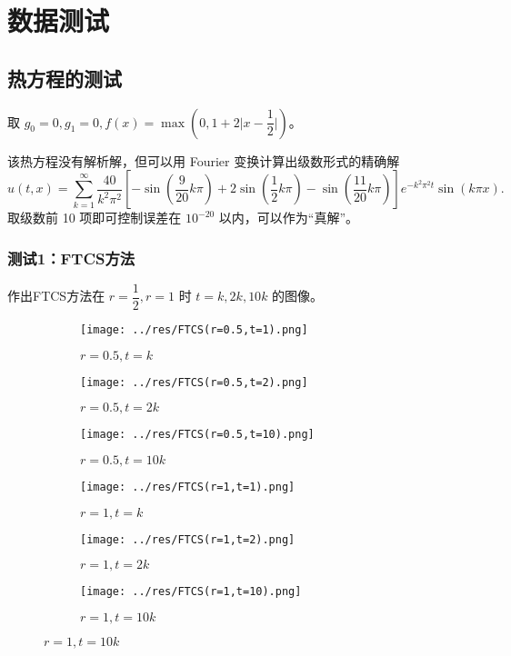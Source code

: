 \documentclass[lang=cn,a4paper,newtx,bibend=bibtex]{elegantpaper}
\begin{document}
\newpage

\section{数据测试}

\subsection{热方程的测试}

取 $g_0=0, g_1=0, f(x) = \max\left(0, 1+2\bigg|x-\dfrac 12\bigg|\right)$。

该热方程没有解析解，但可以用 Fourier 变换计算出级数形式的精确解
\begin{equation}
    u(t,x) = \sum_{k=1}^\infty \frac {40}{k^2\pi^2}\left[-\sin\left(\dfrac{9}{20}k\pi\right) + 2\sin\left(\dfrac 12k\pi\right) - \sin\left(\dfrac{11}{20}k\pi\right)\right]e^{-k^2\pi^2t}\sin(k\pi x).
\end{equation}
取级数前 10 项即可控制误差在 $10^{-20}$ 以内，可以作为“真解”。

\subsubsection{测试1：FTCS方法}

作出FTCS方法在 $r=\dfrac 12, r=1$ 时 $t=k,2k,10k$ 的图像。

\begin{figure}[H]
    \centering
    \begin{subfigure}[b]{0.30\textwidth}
        \texttt{[image: ../res/FTCS(r=0.5,t=1).png]}
        \caption{$r=0.5, t=k$}
    \end{subfigure}
    \hfill
    \begin{subfigure}[b]{0.30\textwidth}
        \texttt{[image: ../res/FTCS(r=0.5,t=2).png]}
        \caption{$r=0.5, t=2k$}
    \end{subfigure}
    \hfill
    \begin{subfigure}[b]{0.30\textwidth}
        \texttt{[image: ../res/FTCS(r=0.5,t=10).png]}
        \caption{$r=0.5, t=10k$}
    \end{subfigure}
    \begin{subfigure}[b]{0.30\textwidth}
        \texttt{[image: ../res/FTCS(r=1,t=1).png]}
        \caption{$r=1, t=k$}
    \end{subfigure}
    \hfill
    \begin{subfigure}[b]{0.30\textwidth}
        \texttt{[image: ../res/FTCS(r=1,t=2).png]}
        \caption{$r=1, t=2k$}
    \end{subfigure}
    \hfill
    \begin{subfigure}[b]{0.30\textwidth}
        \texttt{[image: ../res/FTCS(r=1,t=10).png]}
        \caption{$r=1, t=10k$}
    \end{subfigure}
  \end{figure}
\end{document}
